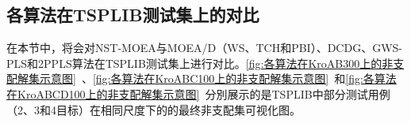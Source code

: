 \subsection{各算法在TSPLIB测试集上的对比}
\label{subsec:NST:实验与讨论:各算法在TSPLIB测试集上的对比}
在本节中，将会对NST-MOEA与MOEA/D（WS、TCH和PBI）、DCDG、GWS-PLS和2PPLS算法在TSPLIB测试集上进行对比。\autoref{fig:各算法在KroAB300上的非支配解集示意图}~、\autoref{fig:各算法在KroABC100上的非支配解集示意图}~和\autoref{fig:各算法在KroABCD100上的非支配解集示意图}~分別展示的是TSPLIB中部分测试用例（2、3和4目标）在相同尺度下的的最终非支配集可视化图。
\par

